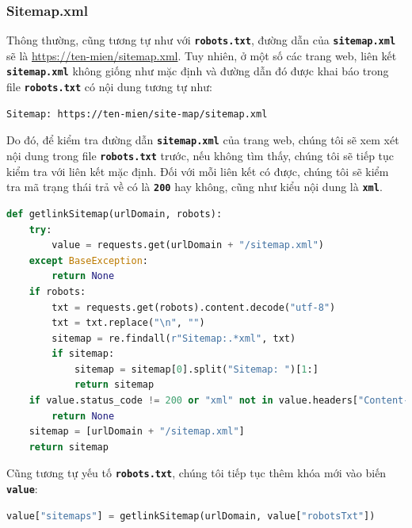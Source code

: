 \subsubsection{Sitemap.xml}
Thông thường, cũng tương tự như với \textbf{\texttt{robots.txt}}, đường dẫn của \textbf{\texttt{sitemap.xml}} sẽ là \url{https://ten-mien/sitemap.xml}. Tuy nhiên, ở một số các trang web, liên kết \textbf{\texttt{sitemap.xml}} không giống như mặc định và đường dẫn đó được khai báo trong file \textbf{\texttt{robots.txt}} có nội dung tương tự như:
\begin{lstlisting}
Sitemap: https://ten-mien/site-map/sitemap.xml
\end{lstlisting}
\par
Do đó, để kiểm tra đường dẫn \textbf{\texttt{sitemap.xml}} của trang web, chúng tôi sẽ xem xét nội dung trong file \textbf{\texttt{robots.txt}} trước, nếu không tìm thấy, chúng tôi sẽ tiếp tục kiểm tra với liên kết mặc định. Đối với mỗi liên kết có được, chúng tôi sẽ kiểm tra mã trạng thái trả về có là \textbf{\texttt{200}} hay không, cũng như kiểu nội dung là \textbf{\texttt{xml}}.
\begin{lstlisting}[language=Python]
def getlinkSitemap(urlDomain, robots):
    try:
        value = requests.get(urlDomain + "/sitemap.xml")
    except BaseException:
        return None
    if robots:
        txt = requests.get(robots).content.decode("utf-8")
        txt = txt.replace("\n", "")
        sitemap = re.findall(r"Sitemap:.*xml", txt)
        if sitemap:
            sitemap = sitemap[0].split("Sitemap: ")[1:]
            return sitemap
    if value.status_code != 200 or "xml" not in value.headers["Content-Type"]:
        return None
    sitemap = [urlDomain + "/sitemap.xml"]
    return sitemap
\end{lstlisting}
\par
Cũng tương tự yếu tố \textbf{\texttt{robots.txt}}, chúng tôi tiếp tục thêm khóa mới vào biến \textbf{\texttt{value}}:
\begin{lstlisting}[language=Python]
value["sitemaps"] = getlinkSitemap(urlDomain, value["robotsTxt"])
\end{lstlisting}
